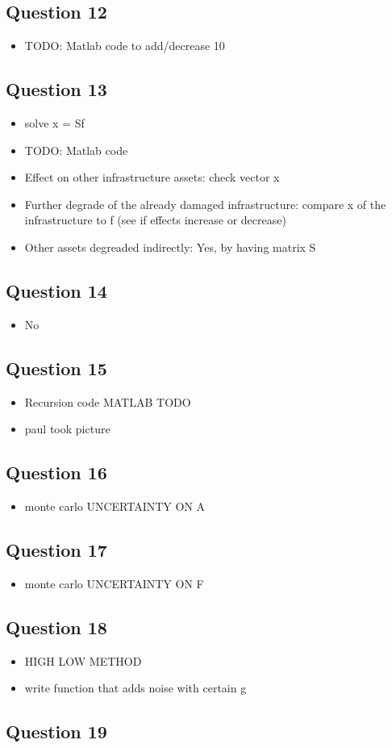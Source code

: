 \documentclass[11pt,a4paper]{article}
\begin{document}
\subsection*{Question 12}
\begin{itemize}
	\item TODO: Matlab code to add/decrease 10%
\end{itemize}

\subsection*{Question 13}
\begin{itemize}
	\item solve x = Sf
	\item TODO: Matlab code
	\item Effect on other infrastructure assets: check vector x
	\item Further degrade of the already damaged infrastructure: compare x of the infrastructure to f (see if effects increase or decrease)
	\item Other assets degreaded indirectly: Yes, by having matrix S
\end{itemize}

\subsection*{Question 14}
\begin{itemize}
	\item No
\end{itemize}

\subsection*{Question 15}
\begin{itemize}
	\item Recursion code MATLAB TODO
	\item paul took picture
\end{itemize}

\subsection*{Question 16}
\begin{itemize}
	\item monte carlo UNCERTAINTY ON A
\end{itemize}

\subsection*{Question 17}
\begin{itemize}
	\item monte carlo UNCERTAINTY ON F
\end{itemize}

\subsection*{Question 18}
\begin{itemize}
	\item HIGH LOW METHOD
	\item write function that adds noise with certain g
\end{itemize}

\subsection*{Question 19}
\end{document}
